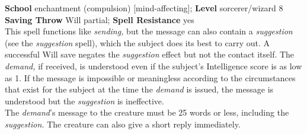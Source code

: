 \textbf{School} enchantment (compulsion) [mind-affecting]; \textbf{Level} sorcerer/wizard 8\\
\textbf{Saving Throw }Will partial; \textbf{Spell Resistance} yes\\
This spell functions like \textit{sending, }but the message can also contain a \textit{suggestion }(see the \textit{suggestion }spell), which the subject does its best to carry out. A successful Will save negates the \textit{suggestion }effect but not the contact itself. The \textit{demand, }if received, is understood even if the subject's Intelligence score is as low as 1. If the message is impossible or meaningless according to the circumstances that exist for the subject at the time the \textit{demand }is issued, the message is understood but the \textit{suggestion }is ineffective.\\
The \textit{demand}'s message to the creature must be 25 words or less, including the \textit{suggestion. }The creature can also give a short reply immediately.\\
